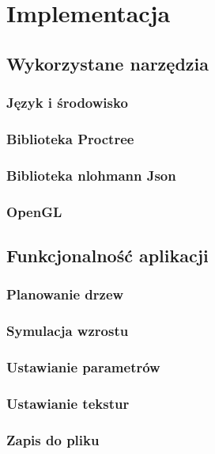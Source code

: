 \documentclass[a4paper,12pt,oneside]{book} %
\begin{document}
\chapter{Implementacja} 

\section{Wykorzystane narzędzia}

\subsection{Język i środowisko}

\subsection{Biblioteka Proctree}

\subsection{Biblioteka nlohmann Json}

\subsection{OpenGL}

\section{Funkcjonalność aplikacji}

\subsection{Planowanie drzew}

\subsection{Symulacja wzrostu}

\subsection{Ustawianie parametrów}

\subsection{Ustawianie tekstur}

\subsection{Zapis do pliku}
\end{document}
